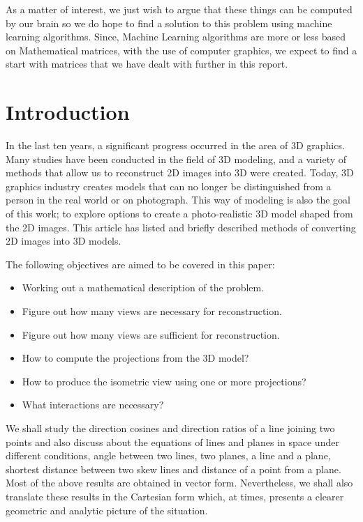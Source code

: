 \documentclass[12pt]{report}
\begin{document}
As a matter of interest, we just wish to argue that these things can be computed by our brain so we do hope to find a solution to this problem using machine learning algorithms. Since, Machine Learning algorithms are more or less based on Mathematical matrices, with the use of computer graphics, we expect to find a start with matrices that we have dealt with further in this report. 

\newpage

\tableofcontents

\newpage

\chapter{Introduction}

In the last ten years, a significant progress occurred in the area of 3D graphics. Many studies have been conducted in the field of 3D modeling, and a variety of methods that allow us to reconstruct 2D images into 3D were created. Today, 3D graphics industry creates models that can no longer be distinguished from a person in the real world or on photograph. This way of modeling is also the goal of this work; to explore options to create a photo-realistic 3D model shaped from the 2D images. This article has listed and briefly described methods of converting 2D images into 3D models.

\vspace{1cm}

The following objectives are aimed to be covered in this paper:

\begin{itemize}
  \item
  Working out a mathematical description of the problem.
  \item
  Figure out how many views are necessary for reconstruction.
  \item
  Figure out how many views are sufficient for reconstruction.
  \item
  How to compute the projections from the 3D model?
  \item
  How to produce the isometric view using one or more projections?
  \item
  What interactions are necessary?
  
\end{itemize}

\vspace{0.5cm}

We shall study the direction cosines and direction ratios of a line joining two points and also discuss about the equations of lines and planes in space under different conditions, angle between two lines, two planes, a line and a plane, shortest distance between two skew lines and distance of a point from a plane. Most of the above results are obtained in vector form. Nevertheless, we shall also translate these results in the Cartesian form which, at times, presents a clearer geometric and analytic picture of the situation.
\\
\vspace{0.5cm}
\end{document}

